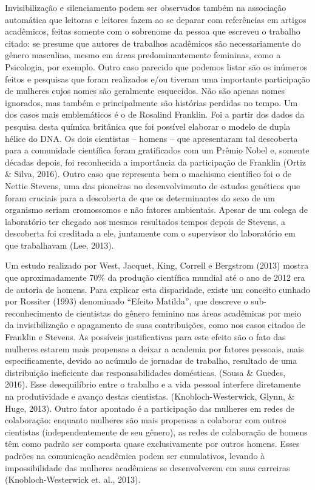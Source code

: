 Invisibilização e silenciamento podem ser observados também na associação automática que leitoras e leitores fazem ao se deparar com referências em artigos acadêmicos, feitas somente com o sobrenome da pessoa que escreveu o trabalho citado: se presume que autores de trabalhos acadêmicos são necessariamente do gênero masculino, mesmo em áreas predominantemente femininas, como a Psicologia, por exemplo. Outro caso parecido que podemos listar são os inúmeros feitos e pesquisas que foram realizados e/ou tiveram uma importante participação de mulheres cujos nomes são geralmente esquecidos. Não são apenas nomes ignorados, mas também e principalmente são histórias perdidas no tempo. Um dos casos mais emblemáticos é o de Rosalind Franklin. Foi a partir dos dados da pesquisa desta química britânica que foi possível elaborar o modelo de dupla hélice do DNA. Os dois cientistas – homens – que apresentaram tal descoberta para a comunidade científica foram gratificados com um Prêmio Nobel e, somente décadas depois, foi reconhecida a importância da participação de Franklin (Ortiz \& Silva, 2016). Outro caso que representa bem o machismo científico foi o de Nettie Stevens, uma das pioneiras no desenvolvimento de estudos genéticos que foram cruciais para a descoberta de que os determinantes do sexo de um organismo seriam cromossomos e não fatores ambientais. Apesar de um colega de laboratório ter chegado aos mesmos resultados tempos depois de Stevens, a descoberta foi creditada a ele, juntamente com o supervisor do laboratório em que trabalhavam (Lee, 2013).

Um estudo realizado por West, Jacquet, King, Correll e Bergstrom (2013) mostra que aproximadamente 70\% da produção científica mundial até o ano de 2012 era de autoria de homens. Para explicar esta disparidade, existe um conceito cunhado por Rossiter (1993) denominado ``Efeito Matilda'', que descreve o sub-reconhecimento de cientistas do gênero feminino nas áreas acadêmicas por meio da invisibilização e apagamento de suas contribuições, como nos casos citados de Franklin e Stevens. As possíveis justificativas para este efeito são o fato das mulheres estarem mais propensas a deixar a academia por fatores pessoais, mais especificamente, devido ao acúmulo de jornadas de trabalho, resultado de uma distribuição ineficiente das responsabilidades domésticas. (Sousa \& Guedes, 2016). Esse desequilíbrio entre o trabalho e a vida pessoal interfere diretamente na produtividade e avanço destas cientistas. (Knobloch-Westerwick, Glynn, \& Huge, 2013). Outro fator apontado é a participação das mulheres em redes de colaboração: enquanto mulheres são mais propensas a colaborar com outros cientistas (independentemente de seu gênero), as redes de colaboração de homens têm como padrão ser composta quase exclusivamente por outros homens. Esses padrões na comunicação acadêmica podem ser cumulativos, levando à impossibilidade das mulheres acadêmicas se desenvolverem em suas carreiras (Knobloch-Westerwick et. al., 2013).

